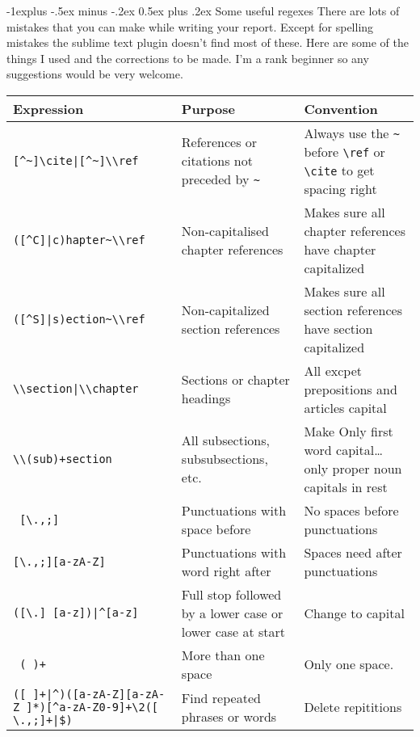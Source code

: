 \documentclass[12pt,landscape]{article}
\makeatletter
\renewcommand{\section}{\@startsection{section}{1}{0mm}%
                                {-1ex plus -.5ex minus -.2ex}%
                                {0.5ex plus .2ex}%
                                {\normalfont\large\bfseries}}
\renewcommand{\subsection}{\@startsection{subsection}{2}{0mm}%
                                {-1explus -.5ex minus -.2ex}%
                                {0.5ex plus .2ex}%
                                {\normalfont\normalsize\bfseries}}
\makeatother
\begin{document}
\subsection{Some useful regexes}
There are lots of mistakes that you can make while writing your report. Except for spelling mistakes the sublime text plugin doesn't find most of these.  Here are some of the things I used and the corrections to be made. I'm a rank beginner so any suggestions would be very welcome.
\\
\vspace{0.25in}
\begin{tabular}{p{4in}  p{2.5in}  p{3in}}
\hline\hline %
Expression                      & Purpose                                       & Convention \\
\hline
\verb![^~]\cite|[^~]\\ref!       & References or citations not preceded by \verb!~!     & Always use the \verb!~! before \verb!\ref! or \verb!\cite! to get spacing right \\
\verb!([^C]|c)hapter~\\ref!       & Non-capitalised chapter references            & Makes sure all chapter references have chapter capitalized \\
\verb!([^S]|s)ection~\\ref!      & Non-capitalized section references            & Makes sure all section references have section capitalized \\
\verb!\\section|\\chapter!      & Sections or chapter headings                  & All excpet prepositions and articles capital \\
\verb!\\(sub)+section!          & All subsections, subsubsections, etc.         & Make Only first word capital…  only proper noun capitals in rest \\
\verb! [\.,;]!                  & Punctuations with space before                & No spaces before punctuations \\
\verb![\.,;][a-zA-Z]!           & Punctuations with word right after            & Spaces need after punctuations \\
\verb!([\.] [a-z])|^[a-z]!      & Full stop followed by a lower case or lower case at start & Change to capital \\
\verb! ( )+!                    & More than one space                           & Only one space. \\
\verb!([ ]+|^)([a-zA-Z][a-zA-Z ]*)[^a-zA-Z0-9]+\2([ \.,;]+|$)! & Find repeated phrases or words & Delete repititions
\end{tabular}
\vspace{0.25in}
\end{document}
